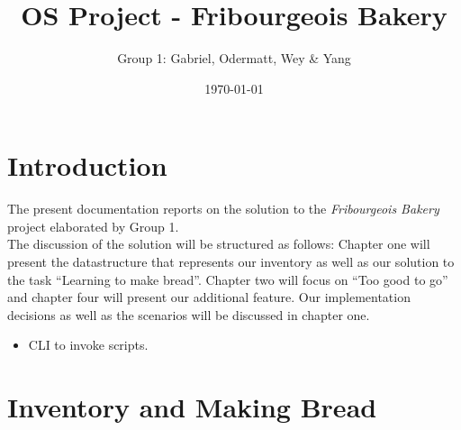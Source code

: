 \documentclass[11pt]{article}
\author{Group 1: Gabriel, Odermatt, Wey \& Yang}
\date{\today}
\title{OS Project - Fribourgeois Bakery}
\begin{document}
\maketitle
\tableofcontents

\setlength\parindent{0pt}

\section{Introduction}
\label{sec:orgddae4fc}

The present documentation reports on the solution to the \emph{Fribourgeois Bakery} project elaborated by Group 1.\\

The discussion of the solution will be structured as follows: Chapter one will present the datastructure that represents our inventory as well as our solution to the task ``Learning to make bread''. Chapter two will focus on ``Too good to go'' and chapter four will present our additional feature. Our implementation decisions as well as the scenarios will be discussed in chapter one.\\

\begin{itemize}
\item CLI to invoke scripts.\\
\end{itemize}

\section{Inventory and Making Bread}
\label{sec:orge8a6dbc}
\end{document}
